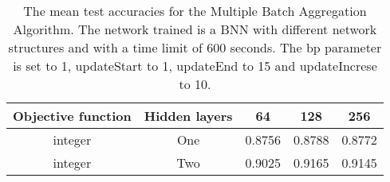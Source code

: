 \begin{center}
\begin{table}[H]
\centering
\begin{tabular}{|c|c|c|c|c|}
  \hline
Objective function & Hidden layers & 64 & 128 & 256 \\ 
  \hline
integer & One & 0.8756 & 0.8788 & 0.8772 \\ 
   \hline
integer & Two & 0.9025 & 0.9165 & 0.9145 \\ 
   \hline
\end{tabular}
\caption{The mean test accuracies for the Multiple Batch Aggregation Algorithm.
            The network trained is a BNN with different network structures and with a time limit of 600 seconds.
            The bp parameter is set to 1, updateStart to 1, updateEnd to 15 and updateIncrese to 10.} 
\label{MBAA_DNS}
\end{table}

\end{center}
